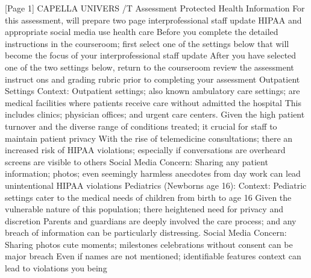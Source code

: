 \documentclass{article}
\begin{document}
[Page 1] CAPELLA UNIVERS /T Assessment Protected Health Information For this assessment, will prepare two page interprofessional staff update HIPAA and appropriate social media use health care Before you complete the detailed instructions in the courseroom; first select one of the settings below that will become the focus of your interprofessional staff update After you have selected one of the two settings below, return to the courseroom review the assessment instruct ons and grading rubric prior to completing your assessment Outpatient Settings Context: Outpatient settings; also known ambulatory care settings; are medical facilities where patients receive care without admitted the hospital This includes clinics; physician offices; and urgent care centers. Given the high patient turnover and the diverse range of conditions treated; it crucial for staff to maintain patient privacy With the rise of telemedicine consultations; there an increased risk of HIPAA violations; especially if conversations are overheard screens are visible to others Social Media Concern: Sharing any patient information; photos; even seemingly harmless anecdotes from day work can lead unintentional HIPAA violations Pediatrics (Newborns age 16): Context: Pediatric settings cater to the medical needs of children from birth to age 16 Given the vulnerable nature of this population; there heightened need for privacy and discretion Parents and guardians are deeply involved the care process; and any breach of information can be particularly distressing. Social Media Concern: Sharing photos cute moments; milestones celebrations without consent can be major breach Even if names are not mentioned; identifiable features context can lead to violations you being
\end{document}
